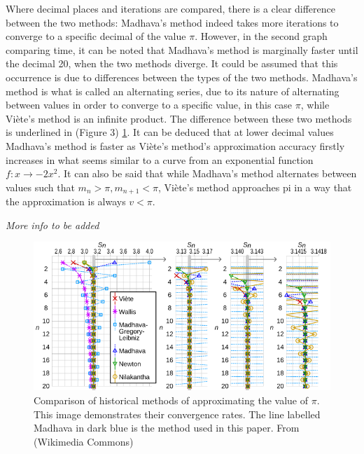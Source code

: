 Where decimal places and iterations are compared, there is a clear difference between the two 
methods: Madhava's method indeed takes more iterations to converge to a specific decimal of 
the value $\pi$. However, in the second graph comparing time, it can be noted that Madhava's 
method is marginally faster until the decimal 20, when the two methods diverge. It could be 
assumed that this occurrence is due to differences between the types of the two methods. Madhava's 
method is what is called an alternating series, due to its nature of alternating between values in order 
to converge to a specific value, in this case $\pi$, while Viète's method is an infinite product. The 
difference between these two methods is underlined in (Figure 3) \ref{fig:comparaison}. It can be 
deduced that at lower decimal values Madhava's method is faster as Viète's method's approximation 
accuracy firstly increases in what seems similar to a curve from an exponential function $f : x \to -2x^2$. 
It can also be said that while Madhava's method alternates between values such that $m_{n} > \pi, m_{n+1} < \pi$, 
Viète's method approaches pi in a way that the approximation is always $v < \pi$.

\textit{More info to be added}


\begin{figure}[h]
    \includegraphics[width=\linewidth]{image.png}
    \caption{Comparison of historical methods of approximating the value of $\pi$. This image demonstrates
    their convergence rates. The line labelled Madhava in dark blue is the method used in this paper. 
    From (Wikimedia Commons) \cite{infinite_series_comparaison}}
    \label{fig:comparaison}
  \end{figure}
